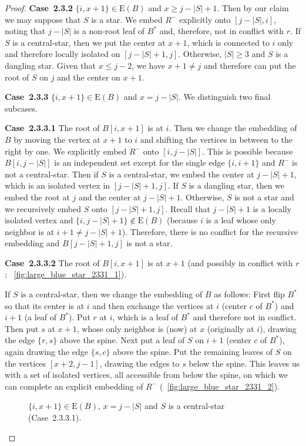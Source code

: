 \documentclass[11pt,a4paper,colorlinks=true,urlcolor=blue,citecolor=red]{article}
\theoremstyle{plain}
\newcommand{\case}[1]{\par\vspace{.5\baselineskip}\noindent\textbf{\sffamily Case~#1}}
\newcommand{\EB}{\mathrm{E}(B)}
\begin{document}
\begin{proof}
  \case{2.3.2} $\{i,x+1\}\in\EB$ and $x\ge j-|S|+1$. Then by
  our claim we may suppose that $S$ is a star. We embed $R^-$ explicitly
  onto $[j-|S|,i]$, noting that $j-|S|$ is a non-root leaf of $B^*$ and,
  therefore, not in conflict with $r$. If $S$ is a central-star, then we
  put the center at $x+1$, which is connected to $i$ only and therefore
  locally isolated on $[j-|S|+1,j]$. Otherwise, $|S|\ge 3$ and $S$ is a
  dangling star. Given that $x\le j-2$, we have $x+1\ne j$ and therefore
  can put the root of $S$ on $j$ and the center on $x+1$.

  \case{2.3.3} $\{i,x+1\}\in\EB$ and $x=j-|S|$. We distinguish
  two final subcases.

  \case{2.3.3.1} The root of $B[i,x+1]$ is at $i$. Then we change the
  embedding of $B$ by moving the vertex at $x+1$ to $i$ and shifting the
  vertices in between to the right by one. We explicitly embed $R^-$
  onto $[i,j-|S|]$. This is possible because $B[i,j-|S|]$ is an
  independent set except for the single edge $\{i,i+1\}$ and $R^-$ is
  not a central-star. Then if $S$ is a central-star, we embed
  the center at $j-|S|+1$, which is an isolated vertex in $[j-|S|+1,j]$.
  If $S$ is a dangling star, then we embed the root at $j$ and
  the center at $j-|S|+1$. Otherwise, $S$ is not a star and we
  recursively embed $S$ onto $[j-|S|+1,j]$. Recall that $j-|S|+1$ is a
  locally isolated vertex and $\{i,j-|S|+1\}\notin\EB$
  (because $i$ is a leaf whose only neighbor is at $i+1\ne j-|S|+1$).
  Therefore, there is no conflict for the recursive embedding and
  $B[j-|S|+1,j]$ is not a star.

  \case{2.3.3.2} The root of $B[i,x+1]$ is at $x+1$ (and possibly in
  conflict with $r$; \figurename~\ref{fig:large_blue_star_2331_1}).

  If $S$ is a central-star, then we change the embedding of $B$ as
  follows: First flip $B^*$ so that its center is at $i$ and then
  exchange the vertices at $i$ (center $c$ of $B^*$) and $i+1$ (a leaf
  of $B^*$). Put $r$ at $i$, which is a leaf of $B^*$ and therefore not
  in conflict. Then put $s$ at $x+1$, whose only neighbor is (now) at
  $x$ (originally at $i$), drawing the edge $\{r,s\}$ above the spine.
  Next put a leaf of $S$ on $i+1$ (center $c$ of $B^*$), again drawing
  the edge $\{s,c\}$ above the spine. Put the remaining leaves of $S$ on
  the vertices $[x+2,j-1]$, drawing the edges to $s$ below the spine.
  This leaves us with a set of isolated vertices, all accessible from
  below the spine, on which we can complete an explicit embedding of
  $R^-$ (\figurename~\ref{fig:large_blue_star_2331_2}).
\begin{figure}[htbp]
    \centering\hfil {}\hfil
    \hfil
    \hfil
    \caption{$\{i,x+1\}\in\EB$, $x=j-|S|$ and $S$ is a
      central-star (Case~2.3.3.1).\label{fig:large_blue_star_2331}}
  \end{figure}



\end{proof}
\end{document}
